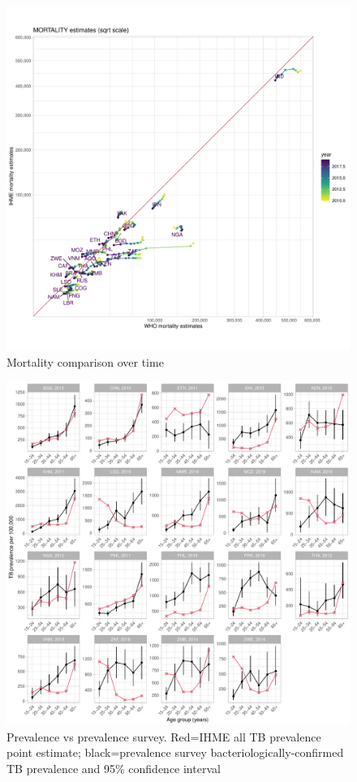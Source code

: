 \documentclass[12pt]{article}
\begin{document}
\FloatBarrier

\begin{figure}
\centering
\includegraphics[width=1\textwidth]{../plots/aF2b.pdf}
\caption{Mortality comparison over time}
\end{figure}

\FloatBarrier

\begin{figure}
\centering
\includegraphics[width=1\textwidth]{../plots/aF3.pdf}
\caption{Prevalence vs prevalence survey. Red=IHME all TB prevalence point
  estimate; black=prevalence survey bacteriologically-confirmed TB prevalence
  and 95\% confidence interval}
\end{figure}
\end{document}
